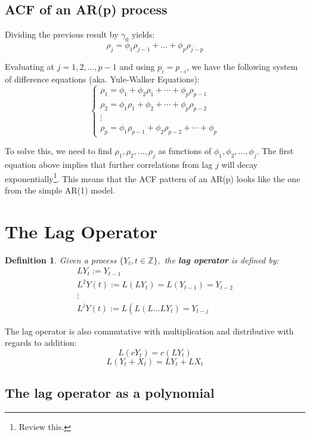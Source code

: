\documentclass[11pt, a4paper]{report}
\theoremstyle{plain}
\theoremstyle{plain}
\newtheorem{defn}{Definition}[section]
\theoremstyle{remark}
\begin{document}
\subsection{ACF of an AR(p) process}

Dividing the previous result by $\gamma_{0}$ yields:
$$ \rho_j = \phi_1 \rho_{j-1} + ... + \phi_p \rho_{j-p} $$

Evaluating at $j = 1,2,..., p - 1$ and using $p_i = p_{-i}$, we have the following system of difference equations (aka. Yule-Walker Equations):
$$\left\{\begin{array}{l}
	\rho_{1}=\phi_{1}+\phi_{2} \rho_{1}+\cdots+\phi_{p} \rho_{p-1} \\
	\rho_{2}=\phi_{1} \rho_{1}+\phi_{2}+\cdots+\phi_{p} \rho_{p-2} \\
	\vdots \\
	\rho_{p}=\phi_{1} \rho_{p-1}+\phi_{2} \rho_{p-2}+\cdots+\phi_{p}
\end{array}\right.$$

To solve this, we need to find $\rho_1, \rho_2, ..., \rho_j$ as functions of $\phi_1, \phi_{2}, ..., \phi_j$. The first equation above implies that further correlations from lag $j$ will decay exponentially\footnote{Review this.}. This means that the ACF pattern of an AR(p) looks like the one from the simple AR(1) model.

\section{The Lag Operator}

\begin{defn}
	Given a process $\{Y_t, t \in \mathbb{Z} \},$ the \textbf{lag operator} is defined by:
$$\begin{array}{l}
	L Y_{t}:=Y_{t-1} \\
	L^{2} Y(t):=L\left(L Y_{t}\right)=L\left(Y_{t-1}\right)=Y_{t-2} \\
	\vdots \\
	L^{j} Y(t):=L\left(L\left(L \ldots L Y_{t}\right)=Y_{t-j}\right.
\end{array}$$
\end{defn}

The lag operator is also commutative with multiplication and distributive with regards to addition:
$$ L(cY_t) = c(LY_t) $$
$$ L(Y_t + X_t) = LY_t + LX_t $$

\subsection{The lag operator as a polynomial}
\end{document}
